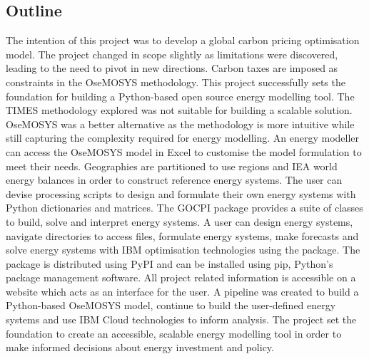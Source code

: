 \documentclass[12pt]{article}
\begin{document}
\subsection{Outline}
The intention of this project was to develop a global carbon pricing optimisation model.
The project changed in scope slightly as limitations were discovered, leading to the need to pivot in new directions.
Carbon taxes are imposed as constraints in the OseMOSYS methodology.
This project successfully sets the foundation for building a Python-based open source energy modelling tool.
The TIMES methodology explored was not suitable for building a scalable solution.
OseMOSYS was a better alternative as the methodology is more intuitive while still capturing the complexity required for energy modelling.
An energy modeller can access the OseMOSYS model in Excel to customise the model formulation to meet their needs.
Geographies are partitioned to use regions and IEA world energy balances in order to construct reference energy systems.
The user can devise processing scripts to design and formulate their own energy systems with Python dictionaries and matrices.
The GOCPI package provides a suite of classes to build, solve and interpret energy systems.
A user can design energy systems, navigate directories to access files, formulate energy systems, make forecasts and solve energy systems with IBM optimisation technologies using the package.
The package is distributed using PyPI and can be installed using pip, Python's package management software.
All project related information is accessible on a website which acts as an interface for the user.
A pipeline was created to build a Python-based OseMOSYS model, continue to build the user-defined energy systems and use IBM Cloud technologies to inform analysis.
The project set the foundation to create an accessible, scalable energy modelling tool in order to make informed decisions about energy investment and policy.
\end{document}
